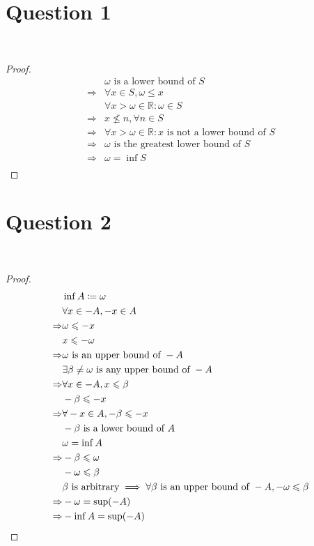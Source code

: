 \documentclass{article}
\begin{document}
\section*{Question 1}

~

\begin{proof}
    \begin{align*}
        &\omega \text{ is a lower bound of }S\\
        \Rightarrow&\forall x\in S, \omega \leqslant x\\
        &\forall x>\omega\in \mathbb{R} : \omega\in S\\
        \Rightarrow&x\nleqslant n,\forall n\in S\\
        \Rightarrow&\forall x>\omega\in\mathbb{R} :x\text{ is not a lower bound of }S\\
        \Rightarrow&\omega\text{ is the greatest lower bound of }S\\
        \Rightarrow&\omega=\inf S\\
    \end{align*}
\end{proof}

\newpage

\section*{Question 2}

~

\begin{proof}
    \begin{align*}
        &\inf A\coloneqq \omega\\
        &\forall x\in -A,-x\in A\\
        \Rightarrow&\omega\leqslant-x\\
        &x\leqslant -\omega\\
        \Rightarrow&\-\omega\text{ is an upper bound of }-A\\
        &\exists \beta\ne \omega\text{ is any upper bound of }-A\\
        \Rightarrow&\forall x\in -A,x\leqslant\beta\\
        &-\beta\leqslant -x\\
        \Rightarrow&\forall -x\in A,-\beta\leqslant -x\\
        &-\beta\text{ is a lower bound of }A\\
        &\omega =\inf A\\
        \Rightarrow&-\beta \leqslant \omega\\
        &-\omega\leqslant \beta\\
        &\beta\text{ is arbitrary}\implies \forall \beta \text{ is an upper bound of }-A,-\omega\leqslant\beta\\
        \Rightarrow&-\omega=\sup (-A)\\
        \Rightarrow&-\inf A=\sup(-A)\\
    \end{align*}
\end{proof}
\end{document}
